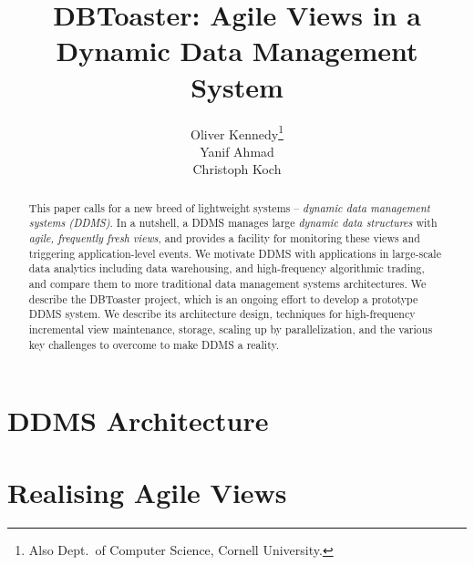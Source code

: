 \documentclass{sig-alternate}
\begin{document}
\title{DBToaster: Agile Views in a\\Dynamic Data Management System}
\author{
\alignauthor
Oliver Kennedy\thanks{Also Dept.\ of Computer Science, Cornell University.}\\
\alignauthor
Yanif Ahmad\\
\alignauthor
Christoph Koch\\
}
\maketitle

\begin{abstract}
This paper calls for a new breed of lightweight systems --
{\em dynamic data management systems (DDMS)}\/.
In a nutshell,
a DDMS manages large {\em dynamic data structures}\/ with 
{\em agile, frequently fresh views}\/, and provides a facility for monitoring
these views and triggering application-level events.
%
We motivate DDMS with applications in large-scale data analytics
including data warehousing, and high-frequency algorithmic trading,
and compare them to more traditional data management systems 
architectures.
%
We describe the DBToaster project, which is an ongoing effort to
develop a prototype DDMS system. We describe its architecture
design, techniques for high-frequency incremental view maintenance,
storage, scaling up by parallelization, and
the various key challenges to overcome to make DDMS a reality.
\end{abstract}



\section{DDMS Architecture}

\label{sec:overview}


\section{Realising Agile Views}
\label{sec:dbtoaster}

\end{document}
